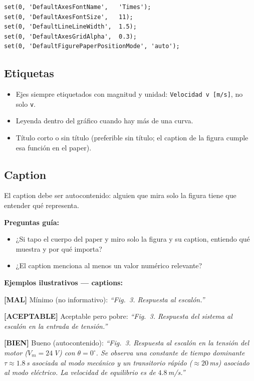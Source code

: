 \documentclass[11pt,a4paper]{article}
\newcommand{\malo}{\textcolor{red!70!black}{\textbf{[MAL]}}}
\newcommand{\medio}{\textcolor{orange!80!black}{\textbf{[ACEPTABLE]}}}
\newcommand{\bueno}{\textcolor{green!50!black}{\textbf{[BIEN]}}}
\begin{document}
\begin{lstlisting}[style=matlab]
set(0, 'DefaultAxesFontName',   'Times');
set(0, 'DefaultAxesFontSize',   11);
set(0, 'DefaultLineLineWidth',  1.5);
set(0, 'DefaultAxesGridAlpha',  0.3);
set(0, 'DefaultFigurePaperPositionMode', 'auto');
\end{lstlisting}

\subsection{Etiquetas}

\begin{itemize}
    \item Ejes siempre etiquetados con magnitud y unidad: \texttt{Velocidad v [m/s]}, no solo \texttt{v}.
    \item Leyenda dentro del gráfico cuando hay más de una curva.
    \item Título corto o sin título (preferible sin título; el caption de la figura cumple esa función en el paper).
\end{itemize}

\subsection{Caption}

El caption debe ser autocontenido: alguien que mira solo la figura tiene que entender qué representa.

\begin{guia}
\textbf{Preguntas guía:}
\begin{itemize}
    \item ¿Si tapo el cuerpo del paper y miro solo la figura y su caption, entiendo qué muestra y por qué importa?
    \item ¿El caption menciona al menos un valor numérico relevante?
\end{itemize}
\end{guia}

\begin{ejemplo}
\textbf{Ejemplos ilustrativos --- captions:}

\malo{} Mínimo (no informativo): \textit{``Fig.~3. Respuesta al escalón.''}

\medio{} Aceptable pero pobre: \textit{``Fig.~3. Respuesta del sistema al escalón en la entrada de tensión.''}

\bueno{} Bueno (autocontenido): \textit{``Fig.~3. Respuesta al escalón en la tensión del motor ($V_m = 24\,$V) con $\theta = 0^\circ$. Se observa una constante de tiempo dominante $\tau \approx 1.8\,$s asociada al modo mecánico y un transitorio rápido ($\approx 20\,$ms) asociado al modo eléctrico. La velocidad de equilibrio es de $4.8\,$m/s.''}
\end{ejemplo}
\end{document}
